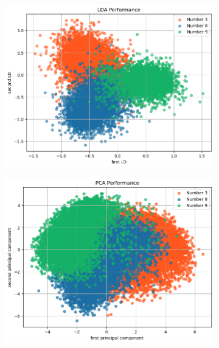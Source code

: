 \documentclass[12pt]{article}
\newcommand{\0}{\boldsymbol{0}}
\begin{document}
\begin{figure}[h!]
    \centering
    \begin{subfigure}[b]{0.45\textwidth}
        \centering
        \includegraphics[width=\textwidth]{../img/problem_1/LDA.png}
        \label{fig:lda}
    \end{subfigure}
    \hfill
    \begin{subfigure}[b]{0.45\textwidth}
        \centering
        \includegraphics[width=\textwidth]{../img/problem_1/PCA.png}
        \label{fig:pca}
    \end{subfigure}
    \label{fig:lda_vs_pca}
\end{figure}
\end{document}
